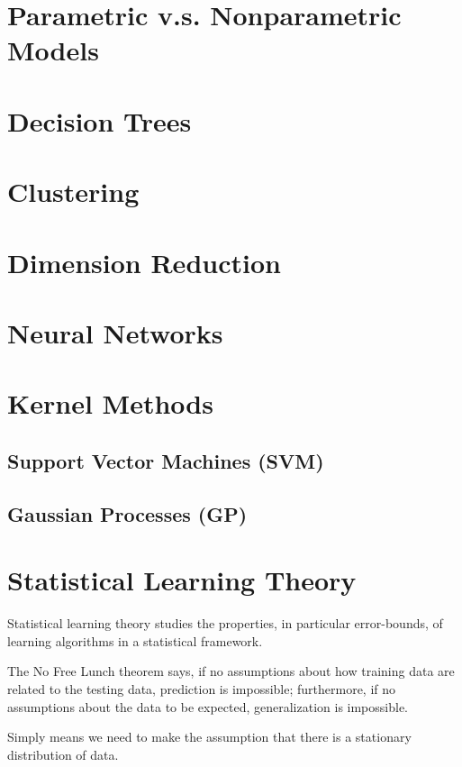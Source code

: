 \documentclass{book}
\begin{document}
\chapter{Parametric v.s. Nonparametric Models}
\chapter{Decision Trees}

\chapter{Clustering}
\chapter{Dimension Reduction}







\chapter{Neural Networks}
\chapter{Kernel Methods}
\section{Support Vector Machines (SVM)}
\section{Gaussian Processes (GP)}

\chapter{Statistical Learning Theory}
Statistical learning theory studies the properties, in particular error-bounds, of learning algorithms in a statistical framework.

The No Free Lunch theorem says, if no assumptions about how training data are related to the testing data, prediction is impossible; furthermore, if no assumptions about the data to be expected, generalization is impossible.

Simply means we need to make the assumption that there is a stationary distribution of data.

\end{document}
